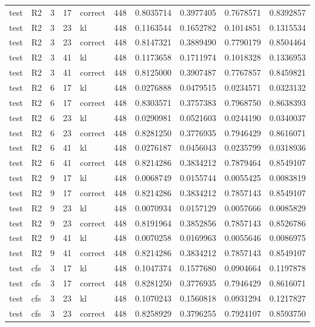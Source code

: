 \begin{tabular}{llrrlrrrrr}
test & R2 & 3 & 17 & correct & 448 & 0.8035714 & 0.3977405 & 0.7678571 & 0.8392857 \\
test & R2 & 3 & 23 & kl & 448 & 0.1163544 & 0.1652782 & 0.1014851 & 0.1315534 \\
test & R2 & 3 & 23 & correct & 448 & 0.8147321 & 0.3889490 & 0.7790179 & 0.8504464 \\
test & R2 & 3 & 41 & kl & 448 & 0.1173658 & 0.1711974 & 0.1018328 & 0.1336953 \\
test & R2 & 3 & 41 & correct & 448 & 0.8125000 & 0.3907487 & 0.7767857 & 0.8459821 \\
test & R2 & 6 & 17 & kl & 448 & 0.0276888 & 0.0479515 & 0.0234571 & 0.0323132 \\
test & R2 & 6 & 17 & correct & 448 & 0.8303571 & 0.3757383 & 0.7968750 & 0.8638393 \\
test & R2 & 6 & 23 & kl & 448 & 0.0290981 & 0.0521603 & 0.0244190 & 0.0340037 \\
test & R2 & 6 & 23 & correct & 448 & 0.8281250 & 0.3776935 & 0.7946429 & 0.8616071 \\
test & R2 & 6 & 41 & kl & 448 & 0.0276187 & 0.0456043 & 0.0235799 & 0.0318936 \\
test & R2 & 6 & 41 & correct & 448 & 0.8214286 & 0.3834212 & 0.7879464 & 0.8549107 \\
test & R2 & 9 & 17 & kl & 448 & 0.0068749 & 0.0155744 & 0.0055425 & 0.0083819 \\
test & R2 & 9 & 17 & correct & 448 & 0.8214286 & 0.3834212 & 0.7857143 & 0.8549107 \\
test & R2 & 9 & 23 & kl & 448 & 0.0070934 & 0.0157129 & 0.0057666 & 0.0085829 \\
test & R2 & 9 & 23 & correct & 448 & 0.8191964 & 0.3852856 & 0.7857143 & 0.8526786 \\
test & R2 & 9 & 41 & kl & 448 & 0.0070258 & 0.0169963 & 0.0055646 & 0.0086975 \\
test & R2 & 9 & 41 & correct & 448 & 0.8214286 & 0.3834212 & 0.7857143 & 0.8549107 \\
test & cfs & 3 & 17 & kl & 448 & 0.1047374 & 0.1577680 & 0.0904664 & 0.1197878 \\
test & cfs & 3 & 17 & correct & 448 & 0.8281250 & 0.3776935 & 0.7946429 & 0.8616071 \\
test & cfs & 3 & 23 & kl & 448 & 0.1070243 & 0.1560818 & 0.0931294 & 0.1217827 \\
test & cfs & 3 & 23 & correct & 448 & 0.8258929 & 0.3796255 & 0.7924107 & 0.8593750 \\

\end{tabular}
